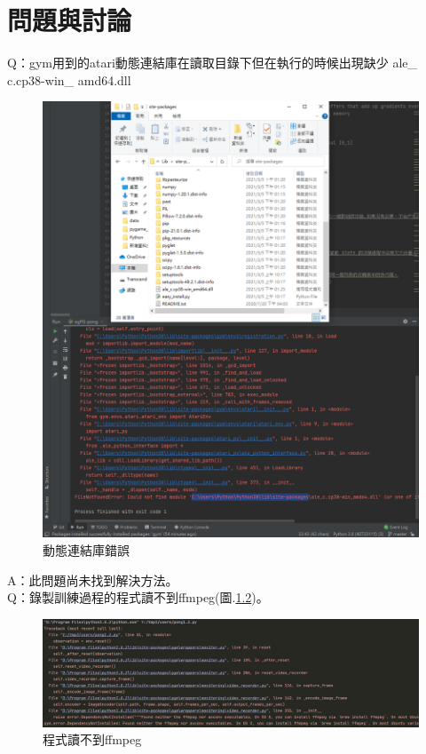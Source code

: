 \documentclass[14pt,a4paper]{report}  %
\begin{document}
\chapter{問題與討論}
\hspace{-1.7em} Q：gym用到的atari動態連結庫在讀取目錄下但在執行的時候出現缺少 ale\_ c.cp38-win\_ amd64.dll\\
\begin{figure}[hbt!]
\begin{center}
\includegraphics[width=15cm]{Q_dll}
\caption{\Large 動態連結庫錯誤}
\label{fig.動態連結庫錯誤}
\end{center}
\end{figure}
\newpage
\hspace{-1.4em}A：此問題尚未找到解決方法。\\
Q：錄製訓練過程的程式讀不到ffmpeg(圖.\ref{fig.Q_ffmpeg})。\\
\begin{figure}[hbt!]
\begin{center}
\includegraphics[width=15cm]{Q_ffmpeg}
\caption{\Large 程式讀不到ffmpeg}
\label{fig.Q_ffmpeg}
\end{center}
\end{figure}
\end{document}
